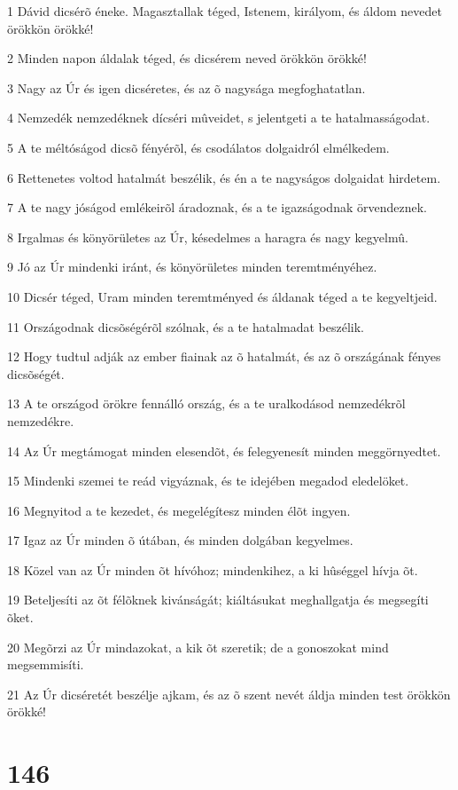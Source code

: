 \par 1 Dávid dicsérõ éneke. Magasztallak téged, Istenem, királyom, és áldom nevedet örökkön örökké!
\par 2 Minden napon áldalak téged, és dicsérem neved örökkön örökké!
\par 3 Nagy az Úr és igen dicséretes, és az õ nagysága megfoghatatlan.
\par 4 Nemzedék nemzedéknek dícséri mûveidet, s jelentgeti a te hatalmasságodat.
\par 5 A te méltóságod dicsõ fényérõl, és csodálatos dolgaidról elmélkedem.
\par 6 Rettenetes voltod hatalmát beszélik, és én a te nagyságos dolgaidat hirdetem.
\par 7 A te nagy jóságod emlékeirõl áradoznak, és a te igazságodnak örvendeznek.
\par 8 Irgalmas és könyörületes az Úr, késedelmes a haragra és nagy kegyelmû.
\par 9 Jó az Úr mindenki iránt, és könyörületes minden teremtményéhez.
\par 10 Dicsér téged, Uram minden teremtményed és áldanak téged a te kegyeltjeid.
\par 11 Országodnak dicsõségérõl szólnak, és a te hatalmadat beszélik.
\par 12 Hogy tudtul adják az ember fiainak az õ hatalmát, és az õ országának fényes dicsõségét.
\par 13 A te országod örökre fennálló ország, és a te uralkodásod nemzedékrõl nemzedékre.
\par 14 Az Úr megtámogat minden elesendõt, és felegyenesít minden meggörnyedtet.
\par 15 Mindenki szemei te reád vigyáznak, és te idejében megadod eledelöket.
\par 16 Megnyitod a te kezedet, és megelégítesz minden élõt ingyen.
\par 17 Igaz az Úr minden õ útában, és minden dolgában kegyelmes.
\par 18 Közel van az Úr minden õt hívóhoz; mindenkihez, a ki hûséggel hívja õt.
\par 19 Beteljesíti az õt félõknek kivánságát; kiáltásukat meghallgatja és megsegíti õket.
\par 20 Megõrzi az Úr mindazokat, a kik õt szeretik; de a gonoszokat mind megsemmisíti.
\par 21 Az Úr dicséretét beszélje ajkam, és az õ szent nevét áldja minden test örökkön örökké!

\chapter{146}

